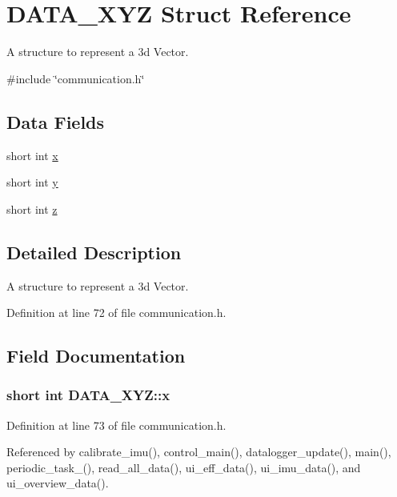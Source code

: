 \hypertarget{structDATA__XYZ}{\section{D\-A\-T\-A\-\_\-\-X\-Y\-Z Struct Reference}
\label{structDATA__XYZ}
}


A structure to represent a 3d Vector.  




{\ttfamily \#include \char`\"{}communication.\-h\char`\"{}}

\subsection*{Data Fields}
\begin{DoxyCompactItemize}
\item 
short int \hyperlink{structDATA__XYZ_a54c1596e9f9969fd9c21e8458024ecfb}{x}
\item 
short int \hyperlink{structDATA__XYZ_a94bbb1c889bf53eb6a5fffa2b39322cf}{y}
\item 
short int \hyperlink{structDATA__XYZ_a69e89ab0ec6e5d72fc5d54f62cc07fb5}{z}
\end{DoxyCompactItemize}


\subsection{Detailed Description}
A structure to represent a 3d Vector. 

Definition at line 72 of file communication.\-h.



\subsection{Field Documentation}
\hypertarget{structDATA__XYZ_a54c1596e9f9969fd9c21e8458024ecfb}{
\subsubsection[{x}]{\setlength{\rightskip}{0pt plus 5cm}short int D\-A\-T\-A\-\_\-\-X\-Y\-Z\-::x}}\label{structDATA__XYZ_a54c1596e9f9969fd9c21e8458024ecfb}


Definition at line 73 of file communication.\-h.



Referenced by calibrate\-\_\-imu(), control\-\_\-main(), datalogger\-\_\-update(), main(), periodic\-\_\-task\-\_(), read\-\_\-all\-\_\-data(), ui\-\_\-eff\-\_\-data(), ui\-\_\-imu\-\_\-data(), and ui\-\_\-overview\-\_\-data().

